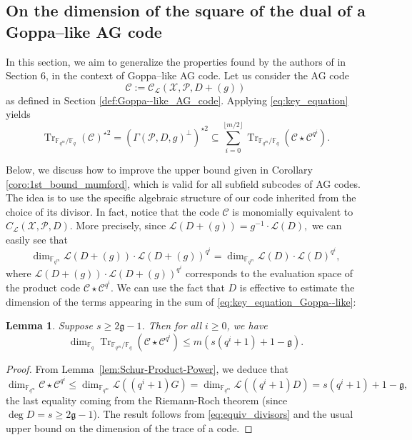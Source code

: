 \documentclass[a4paper]{amsart}
\newtheorem{lemma}[thm]{Lemma}
\theoremstyle{definition}
\theoremstyle{remark}
\newcommand{\calP}{\mathcal{P}}
\newcommand{\calL}{\mathcal{L}}
\newcommand{\calC}{\mathcal{C}}
\newcommand{\calX}{\mathcal{X}}
\newcommand{\fqm}{\mathbb{F}_{q^m}}
\newcommand{\fq}{\mathbb{F}_{q}}
\newcommand{\Tr}[1]{\operatorname{Tr}_{\mathbb{F}_{q^m}/\fq}\left(#1\right)}
\begin{document}
\subsection{On the dimension of the square of the dual of a Goppa--like AG code} \label{section:1st_improvement}
In this section, we aim to generalize the properties found by the authors of \cite{MT21} in Section 6, in the context of Goppa--like AG code. Let us consider the AG code 
$$\calC := \calC_{\calL}(\calX,\calP,D+(g))$$
as defined in Section \ref{def:Goppa--like_AG_code}. Applying \eqref{eq:key_equation} yields   
\begin{equation} \label{eq:key_equation_Goppa--like} 
\Tr{\calC}^{\star 2} = (\Gamma(\calP,D,g)^{\perp})^{\star2} \subseteq \sum\limits_{i=0}^{\lfloor{m/2} \rfloor} \Tr{\calC\star \calC^{q^i}}.
\end{equation}

Below, we discuss how to improve the upper bound given in Corollary \ref{coro:1st_bound_mumford}, which is valid for all subfield subcodes of AG codes. The idea is to use the specific algebraic structure of our code inherited from the choice of its divisor.
\noindent In fact, notice that the code $\calC$ is monomially equivalent to $C_{\calL}(\calX,\calP,D)$. 
More precisely, since $\calL(D+(g)) = g^{-1} \cdot \calL(D),$
we can easily see that
\begin{equation} \label{eq:equiv_divisors}
\dim_{\fqm} \calL(D+(g))\cdot \calL(D+(g))^{q^i} = \dim_{\fqm} \calL(D)\cdot \calL(D)^{q^i},
\end{equation}
where $\calL(D+(g))\cdot \calL(D+(g))^{q^i}$ corresponds to the evaluation space of the product code $\calC \star \calC^{q^i}$. We can use the fact that $D$ is effective to estimate the dimension of the terms appearing in the sum of \eqref{eq:key_equation_Goppa--like}:

\begin{lemma} \label{lem:bound_dim_Tr(C*C^q^i)}
  Suppose $s \geq 2\mathfrak{g}-1$. Then for all $i \geq 0$, we have 
   $$\dim_{\fq} \Tr{\calC\star \calC^{q^i}} \leq m\left(s\left(q^i+1\right)+1-\mathfrak{g}\right).$$
\end{lemma}
\begin{proof}
From Lemma~\ref{lem:Schur-Product-Power}, we deduce that 
\[\dim_{\fqm} \calC\star \calC^{q^i} \leq \dim_{\fqm} \calL((q^i+1)G) = \dim_{\fqm} \calL((q^i+1)D) = s(q^i+1)+1-\mathfrak{g},\]
the last equality coming from the Riemann-Roch theorem (since $\deg D =s \geq 2\mathfrak{g}-1$). The result follows from \eqref{eq:equiv_divisors} and the usual upper bound on the dimension of the trace of a code. 
\end{proof}
\end{document}
